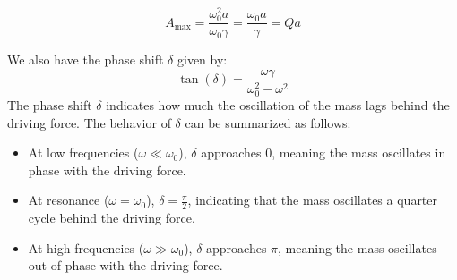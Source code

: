 \documentclass[11pt]{report}
\begin{document}
\begin{definition}
\begin{enumerate}
        \begin{equation}
            A_{\text{max}} = \frac{\omega_0^2 a}{\omega_0 \gamma} = \frac{\omega_0 a}{\gamma} = Q a
        \end{equation}
    \end{enumerate}
    We also have the phase shift \( \delta \) given by:
    \begin{equation}
        \tan(\delta) = \frac{\omega \gamma}{\omega_0^2 - \omega^2}
    \end{equation}
    The phase shift \( \delta \) indicates how much the oscillation of the mass lags behind the driving force. The behavior of \( \delta \) can be summarized as follows:
    \begin{itemize}
        \item At low frequencies (\( \omega \ll \omega_0 \)), \( \delta \) approaches 0, meaning the mass oscillates in phase with the driving force.
        \item At resonance (\( \omega = \omega_0 \)), \( \delta = \frac{\pi}{2} \), indicating that the mass oscillates a quarter cycle behind the driving force.
        \item At high frequencies (\( \omega \gg \omega_0 \)), \( \delta \) approaches \( \pi \), meaning the mass oscillates out of phase with the driving force.
    \end{itemize}
\end{definition}
\end{document}
